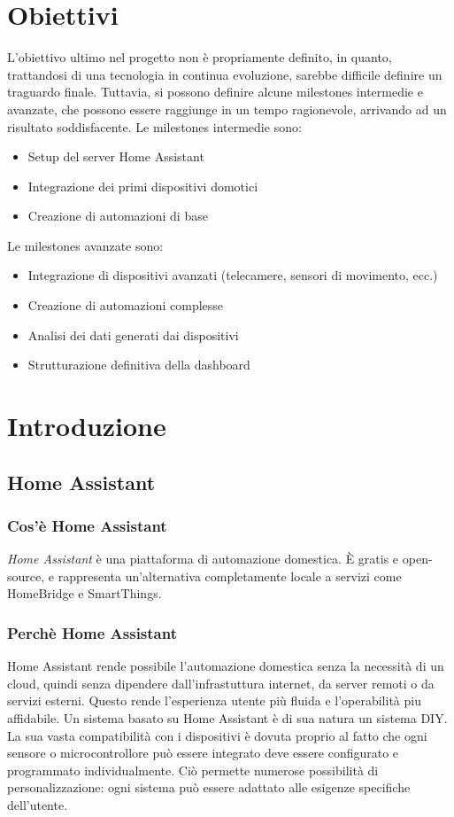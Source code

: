 \documentclass[11pt, a4paper]{article}
\begin{document}
\section{Obiettivi}
L'obiettivo ultimo nel progetto non è propriamente definito, in quanto,
trattandosi di una tecnologia 
in continua evoluzione, sarebbe difficile
definire un traguardo 
finale. Tuttavia, si 
possono definire alcune milestones
intermedie e avanzate, 
che possono essere raggiunge in un tempo ragionevole,
arrivando ad un risultato soddisfacente.
Le milestones intermedie sono:
\begin{itemize}
    \item Setup del server Home Assistant
    \item Integrazione dei primi dispositivi domotici
    \item Creazione di automazioni di base
    
\end{itemize}

Le milestones avanzate sono:
\begin{itemize}
    \item Integrazione di dispositivi avanzati (telecamere, sensori di movimento, ecc.)
    \item Creazione di automazioni complesse
    \item Analisi dei dati generati dai dispositivi
    \item Strutturazione definitiva della dashboard
\end{itemize}

\section{Introduzione}

\subsection{Home Assistant}

\subsubsection{Cos'è Home Assistant}
\textit{Home Assistant} è una piattaforma di automazione domestica. È gratis e open-source, e
rappresenta un'alternativa completamente locale a servizi come HomeBridge e SmartThings.

\subsubsection{Perchè Home Assistant}
Home Assistant rende possibile l'automazione domestica senza la necessità di un cloud,
quindi senza dipendere dall'infrastuttura internet, da server remoti o da servizi esterni.
Questo rende l'esperienza utente più fluida e l'operabilità piu affidabile.
Un sistema basato su Home Assistant è di sua natura un sistema DIY. La sua vasta compatibilità
con i dispositivi è dovuta proprio al fatto che ogni sensore o microcontrollore può essere integrato
deve essere configurato e programmato individualmente. Ciò permette numerose possibilità di
personalizzazione: ogni sistema può essere adattato alle esigenze specifiche dell'utente.
\end{document}
